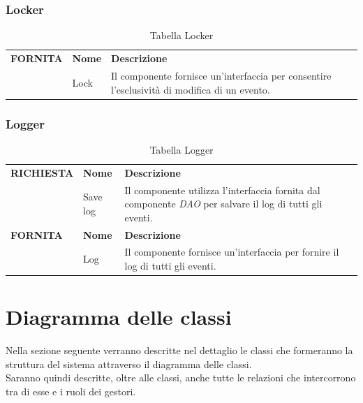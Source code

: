 \documentclass{article}
\begin{document}
\subsubsection{Locker}

\begin{table}[htbp]
    \centering
    \renewcommand{\arraystretch}{1.3} %
    \begin{tabularx}{\textwidth}{| l | l | X |}
        \Xhline{2pt}
        \textbf{FORNITA} & \textbf{Nome} & \textbf{Descrizione} \\
        \Xhline{2pt}
         & Lock & Il componente fornisce un'interfaccia per consentire l'esclusività di modifica di un evento. \\
        \hline
    \end{tabularx}
    \caption{Tabella Locker}
\end{table}

\subsubsection{Logger}

\begin{table}[htbp]
    \centering
    \renewcommand{\arraystretch}{1.3} %
    \begin{tabularx}{\textwidth}{| l | l | X |}
        \Xhline{2pt}
        \textbf{RICHIESTA} & \textbf{Nome} & \textbf{Descrizione} \\
        \Xhline{2pt}
         & Save log & Il componente utilizza l'interfaccia fornita dal componente \textit{DAO} per salvare il log di tutti gli eventi. \\
        \Xhline{2pt}
        \textbf{FORNITA} & \textbf{Nome} & \textbf{Descrizione} \\
        \Xhline{2pt}
         & Log & Il componente fornisce un'interfaccia per fornire il log di tutti gli eventi. \\
        \hline
    \end{tabularx}
    \caption{Tabella Logger}
\end{table}

\clearpage


\section{Diagramma delle classi}

Nella sezione seguente verranno descritte nel dettaglio le classi che formeranno la struttura del sistema attraverso il diagramma delle classi.\\
Saranno quindi descritte, oltre alle classi, anche tutte le relazioni che intercorrono tra di esse e i ruoli dei gestori.\\
\end{document}
